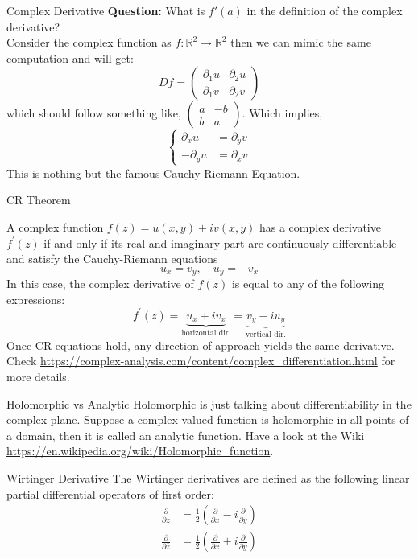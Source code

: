 \documentclass[11pt]{beamer}
\theoremstyle{plain}
\begin{document}
\begin{frame}{Complex Derivative}
    \textbf{Question:} What is $f'(a)$ in the definition of the complex derivative?\\
    Consider the complex function as $f:\mathbb R^2\rightarrow\mathbb R^2$ then we can mimic the same computation and will get:
    $$
    Df=\begin{pmatrix}
        \partial_1 u&\partial_2 u\\\partial_1 v&\partial_2v
    \end{pmatrix}
    $$
    which should follow something like, $\begin{pmatrix}
        a&-b\\b&a
    \end{pmatrix}$. Which implies, 
    $$
        \begin{cases}
            \partial_x u&=\partial_y v\\
            -\partial_y u&= \partial_x v
        \end{cases}
    $$
    This is nothing but the famous Cauchy-Riemann Equation. 
\end{frame}
\begin{frame}{CR Theorem}
    \begin{definition}
        A complex function $f(z)=u(x, y)+i v(x, y)$ has a complex derivative $f^{\prime}(z)$ if and only if its real and imaginary part are continuously differentiable and satisfy the Cauchy-Riemann equations
    $$
        u_x=v_y, \quad u_y=-v_x
    $$
In this case, the complex derivative of $f(z)$ is equal to any of the following expressions:
    $$
        f^{\prime}(z)=\underbrace{u_x+i v_x}_{\text{horizontal dir.}}=\underbrace{v_y-i u_y}_{\text{vertical dir.}}
    $$
    Once CR equations hold, any direction of approach yields the same derivative. Check \url{https://complex-analysis.com/content/complex_differentiation.html} for more details.
    \end{definition}
\end{frame}
\begin{frame}{Holomorphic vs Analytic}
    Holomorphic is just talking about differentiability in the complex plane. Suppose a complex-valued function is holomorphic in all points of a domain, then it is called an analytic function. Have a look at the Wiki \url{https://en.wikipedia.org/wiki/Holomorphic_function}. 
\end{frame}
\begin{frame}{Wirtinger Derivative}
    The Wirtinger derivatives are defined as the following linear partial differential operators of first order:
    \begin{align*}{\frac {\partial }{\partial z}}&={\frac {1}{2}}\left({\frac {\partial }{\partial x}}-i{\frac {\partial }{\partial y}}\right)\\{\frac {\partial }{\partial {\bar {z}}}}&={\frac {1}{2}}\left({\frac {\partial }{\partial x}}+i{\frac {\partial }{\partial y}}\right)\end{align*}
\end{frame}
\end{document}
